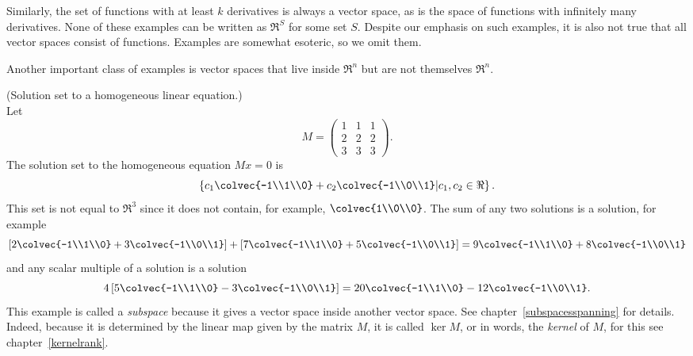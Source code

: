 Similarly, the set of functions with at least $k$ derivatives is always a vector space, as is the space of functions with infinitely many derivatives. 
None of these examples can be written as $\Re^S$ for some set $S$.
Despite our emphasis on such examples, it is also not true that all vector spaces consist of functions. Examples are somewhat esoteric, so we omit them.

Another important class of examples is vector spaces that live inside $\Re^n$ but are not themselves $\Re^n$. 

\begin{example} (Solution set to a homogeneous linear equation.)\\
Let 
\[ M = \begin{pmatrix}
      1 & 1 &1 \\
      2&2&2 \\
      3&3&3
    \end{pmatrix}.\]
    The solution set to the homogeneous equation $Mx=0$ is 
\[\left\{ c_1\colvec{-1\\1\\0} + c_2 \colvec{-1\\0\\1} \middle\vert c_1,c_2\in \Re \right\}.\]
    This set is not equal to $\Re^3$ since it does not contain, for example,  $\colvec{1\\0\\0}$. 
The sum of any two solutions is a solution, for example 
\[
    \left[ 2\colvec{-1\\1\\0} + 3 \colvec{-1\\0\\1} \right] 
+ \left [ 7\colvec{-1\\1\\0} + 5 \colvec{-1\\0\\1} \right]
=
 9\colvec{-1\\1\\0} + 8 \colvec{-1\\0\\1} 
\]
and any scalar multiple of a solution is a solution
\[
4\left[ 5\colvec{-1\\1\\0} - 3 \colvec{-1\\0\\1} \right]
=      20\colvec{-1\\1\\0} - 12 \colvec{-1\\0\\1} . 
\]
This example is called a {\itshape subspace} because it gives a vector space inside another vector space. See chapter~\ref{subspacesspanning}
for details. Indeed, because it is determined by the linear map given by the matrix $M$, it is called $\ker M$, or in words, the {\itshape kernel} of $M$,
for this see chapter~\ref{kernelrank}. 
\end{example}

